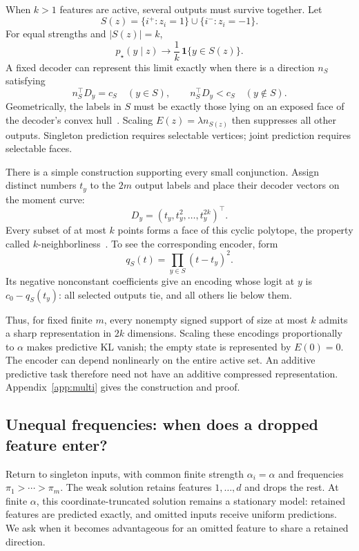 When $k>1$ features are active, several outputs must survive
together. Let
\[
S(z)=\{i^+:z_i=1\}\cup\{i^-:z_i=-1\}.
\]
For equal strengths and $|S(z)|=k$,
\begin{equation}
p_\star(y\mid z)
\longrightarrow
\frac1k\,\mathbf1\{y\in S(z)\}.
\label{eq:sharp-support}
\end{equation}
A fixed decoder can represent this limit exactly when there is
a direction $n_S$ satisfying
\begin{equation}
n_S^\top D_y=c_S \quad (y\in S),
\qquad
n_S^\top D_y<c_S \quad (y\notin S).
\label{eq:face}
\end{equation}
Geometrically, the labels in $S$ must be exactly those lying on
an exposed face of the decoder's convex hull~\cite{rauh}.
Scaling $E(z)=\lambda n_{S(z)}$ then suppresses all other outputs.
Singleton prediction requires selectable vertices; joint
prediction requires selectable faces.

There is a simple construction supporting every small
conjunction. Assign distinct numbers $t_y$ to the $2m$ output
labels and place their decoder vectors on the moment curve:
\begin{equation}
D_y=(t_y,t_y^2,\ldots,t_y^{2k})^\top.
\label{eq:moment-decoder}
\end{equation}
Every subset of at most $k$ points forms a face of this cyclic
polytope, the property called
$k$-neighborliness~\cite{rauh,donoho-tanner}. To see the
corresponding encoder, form
\[
q_S(t)=\prod_{y\in S}(t-t_y)^2.
\]
Its negative nonconstant coefficients give an encoding whose
logit at $y$ is $c_0-q_S(t_y)$: all selected outputs tie, and
all others lie below them.

Thus, for fixed finite $m$, every nonempty signed support of size
at most $k$ admits a sharp representation in $2k$ dimensions.
Scaling these encodings proportionally to $\alpha$ makes
predictive KL vanish; the empty state is represented by $E(0)=0$.
The encoder can depend nonlinearly on the entire active set.
An additive predictive task therefore need not have an additive
compressed representation. Appendix~\ref{app:multi} gives the
construction and proof.

\subsection{Unequal frequencies: when does a dropped feature enter?}

Return to singleton inputs, with common finite strength
$\alpha_i=\alpha$ and frequencies
$\pi_1>\cdots>\pi_m$. The weak solution retains features
$1,\ldots,d$ and drops the rest. At finite $\alpha$, this
coordinate-truncated solution remains a stationary model:
retained features are predicted exactly, and omitted inputs
receive uniform predictions. We ask when it becomes advantageous
for an omitted feature to share a retained direction.

